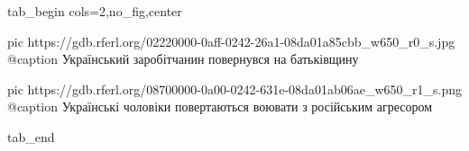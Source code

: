  
 
 
 
 


\ifcmt
  tab_begin cols=2,no_fig,center

     pic https://gdb.rferl.org/02220000-0aff-0242-26a1-08da01a85cbb_w650_r0_s.jpg
		 @caption Український заробітчанин повернувся на батьківщину

		 pic https://gdb.rferl.org/08700000-0a00-0242-631e-08da01ab06ae_w650_r1_s.png
		 @caption Українські чоловіки повертаються воювати з російським агресором

  tab_end
\fi
